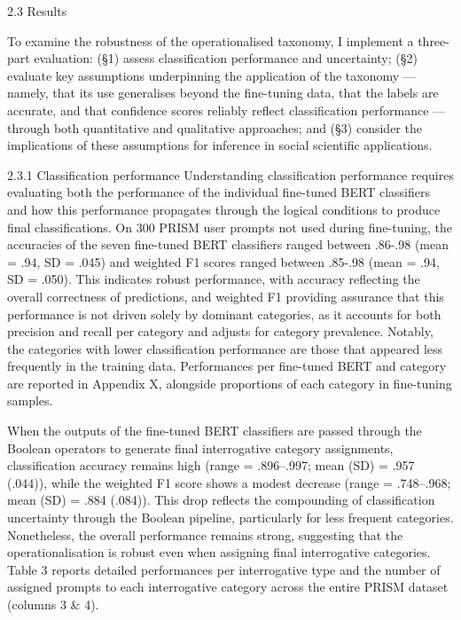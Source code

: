 \documentclass[
  12pt,
]{article}
\begin{document}
2.3 Results

To examine the robustness of the operationalised taxonomy, I implement a three-part evaluation: (§1) assess classification performance and uncertainty; (§2) evaluate key assumptions underpinning the application of the taxonomy --- namely, that its use generalises beyond the fine-tuning data, that the labels are accurate, and that confidence scores reliably reflect classification performance --- through both quantitative and qualitative approaches; and (§3) consider the implications of these assumptions for inference in social scientific applications.

2.3.1 Classification performance
Understanding classification performance requires evaluating both the performance of the individual fine-tuned BERT classifiers and how this performance propagates through the logical conditions to produce final classifications. On 300 PRISM user prompts not used during fine-tuning, the accuracies of the seven fine-tuned BERT classifiers ranged between .86-.98 (mean = .94, SD = .045) and weighted F1 scores ranged between .85-.98 (mean = .94, SD = .050). This indicates robust performance, with accuracy reflecting the overall correctness of predictions, and weighted F1 providing assurance that this performance is not driven solely by dominant categories, as it accounts for both precision and recall per category and adjusts for category prevalence. Notably, the categories with lower classification performance are those that appeared less frequently in the training data. Performances per fine-tuned BERT and category are reported in Appendix X, alongside proportions of each category in fine-tuning samples.

When the outputs of the fine-tuned BERT classifiers are passed through the Boolean operators to generate final interrogative category assignments, classification accuracy remains high (range = .896--.997; mean (SD) = .957 (.044)), while the weighted F1 score shows a modest decrease (range = .748--.968; mean (SD) = .884 (.084)). This drop reflects the compounding of classification uncertainty through the Boolean pipeline, particularly for less frequent categories. Nonetheless, the overall performance remains strong, suggesting that the operationalisation is robust even when assigning final interrogative categories. Table 3 reports detailed performances per interrogative type and the number of assigned prompts to each interrogative category across the entire PRISM dataset (columns 3 \& 4).
\end{document}
